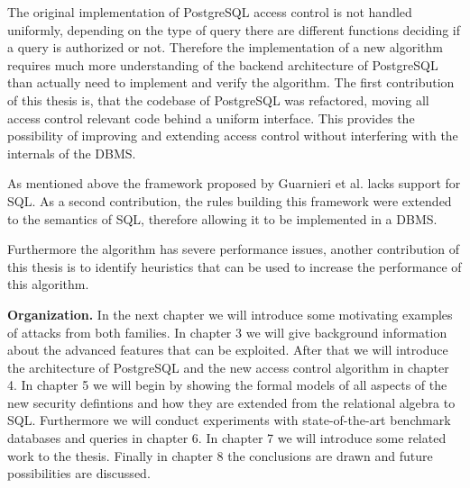 
The original implementation of PostgreSQL access control is not handled uniformly, depending on the type of query there are different functions deciding if a query is authorized or not. 
%
Therefore the implementation of a new algorithm requires much more understanding of the backend architecture of PostgreSQL than actually need to implement and verify the algorithm.
%
The first contribution of this thesis is, that the codebase of PostgreSQL was refactored, moving all access control relevant code behind a uniform interface.
%
This provides the possibility of improving and extending access control without interfering with the internals of the DBMS.

As mentioned above the framework proposed by Guarnieri et al. lacks support for SQL. 
%
As a second contribution, the rules building this framework were extended to the semantics of SQL, therefore allowing it to be implemented in a DBMS. 

Furthermore the algorithm has severe performance issues, another contribution of this thesis is to identify heuristics that can be used to increase the performance of this algorithm. 


%


\smallskip
\noindent
{\bf Organization.}
%
In the next chapter we will introduce some motivating examples of attacks from both families. 
%
In chapter 3 we will give background information about the advanced features that can be exploited. 
%
After that we will introduce the architecture of PostgreSQL and the new access control algorithm in chapter 4. 
%
In chapter 5 we will begin by showing the formal models of all aspects of the new security defintions and how they are extended from the relational algebra to SQL. 
%
Furthermore we will conduct experiments with state-of-the-art benchmark databases and queries in chapter 6. 
%
In chapter 7 we will introduce some related work to the thesis. 
%
Finally in chapter 8 the conclusions are drawn and future possibilities are discussed.